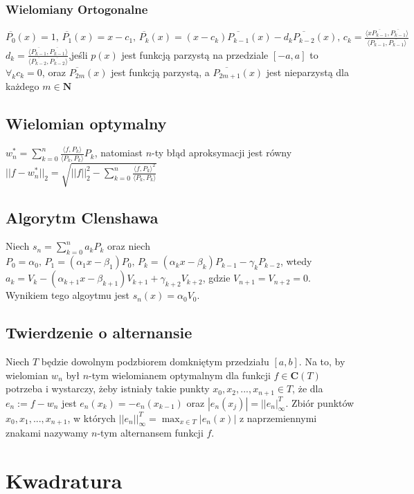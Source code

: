 \documentclass{article}
\begin{document}
\begin{minipage}[t]{.33\textwidth}
\subsubsection*{Wielomiany Ortogonalne}
$\overline{P_0}(x) = 1\text{, } \overline{P_1}(x) = x - c_1\text{, } \overline{P_k}(x) = (x-c_k) \overline{P_{k-1}}(x) -d_k\overline{P_{k-2}}(x)\text{, }c_k = \frac{\langle x\overline{P_{k-1}},\overline{P_{k-1}}\rangle}{\langle\overline{P_{k-1}},\overline{P_{k-1}}\rangle}$ $d_k = \frac{\langle\overline{P_{k-1}},\overline{P_{k-1}}\rangle}{\langle\overline{P_{k-2}},\overline{P_{k-2}}\rangle}$,jeśli $p(x)$ jest funkcją parzystą na przedziale $[-a,a]$ to $\forall_k c_k = 0$, oraz $\overline{P_{2m}}(x)$ jest funkcją parzystą, a $\overline{P_{2m+1}}(x)$ jest nieparzystą dla każdego $m \in \mathbf{N}$ 
\subsection*{Wielomian optymalny}
$w_n^* = \sum_{k=0}^{n}\frac{\langle f,P_k \rangle}{\langle P_k,P_k \rangle}P_k$,  natomiast $n$-ty błąd aproksymacji jest równy 
$||f-w_n^*||_2 = \sqrt{||f||_2^2 - \sum_{k=0}^{n}\frac{\langle f,P_k \rangle^2}{\langle P_k,P_k \rangle}}$
\subsection*{Algorytm Clenshawa}
Niech $s_n = \sum_{k=0}^{n}a_kP_k$ oraz niech $P_0 = \alpha_0\text{, } P_1 = (\alpha_1 x - \beta_1)P_0\text{, } P_k = (\alpha_k x - \beta_k) P_{k-1} - \gamma_k P_{k-2}$, wtedy $a_k = V_k - (\alpha_{k+1}x - \beta_{k+1})V_{k+1} + \gamma_{k+2}V_{k+2}$, gdzie $V_{n+1} = V_{n+2} = 0$. Wynikiem tego algoytmu jest $s_n(x) = \alpha_0 V_0$.
\subsection*{Twierdzenie o alternansie}
Niech $T$ będzie dowolnym podzbiorem domkniętym przedziału $[a,b]$. Na to, by wielomian $w_n$ był $n$-tym wielomianem optymalnym dla funkcji $f \in \mathbf{C}(T)$ potrzeba i wystarczy, żeby istniały takie punkty $x_0,x_2,...,x_{n+1} \in T$, że dla $e_n := f - w_n$ jest $e_n(x_k) = -e_n(x_{k-1})$ oraz $|e_n(x_j)| = ||e_n|_\infty^T$. Zbiór punktów $x_0,x_1,...,x_{n+1}$, w których $||e_n||_\infty^T = \max_{x \in T}|e_n(x)|$ z naprzemiennymi znakami nazywamy $n$-tym alternansem funkcji $f$.
\section*{Kwadratura}

\end{minipage}
\end{document}
